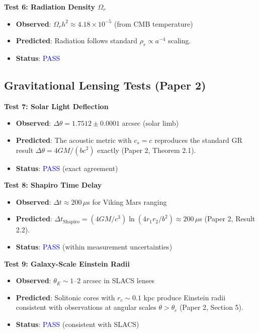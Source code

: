 \documentclass[11pt,a4paper]{article}
\theoremstyle{definition}
\theoremstyle{remark}
\begin{document}
\textbf{Test 6: Radiation Density $\Omega_r$}

\begin{itemize}[leftmargin=*, itemsep=0.1em]
\item \textbf{Observed}: $\Omega_r h^2 \approx 4.18 \times 10^{-5}$ (from CMB temperature)
\item \textbf{Predicted}: Radiation follows standard $\rho_r \propto a^{-4}$ scaling.
\item \textbf{Status}: \textcolor{blue}{PASS}
\end{itemize}

\subsection{Gravitational Lensing Tests (Paper 2)}
\label{sec:tests_lensing}

\textbf{Test 7: Solar Light Deflection}

\begin{itemize}[leftmargin=*, itemsep=0.1em]
\item \textbf{Observed}: $\Delta\theta = 1.7512 \pm 0.0001$ arcsec (solar limb)
\item \textbf{Predicted}: The acoustic metric with $c_s = c$ reproduces the standard GR result $\Delta\theta = 4GM/(bc^2)$ exactly (Paper 2, Theorem 2.1).
\item \textbf{Status}: \textcolor{blue}{PASS} (exact agreement)
\end{itemize}

\textbf{Test 8: Shapiro Time Delay}

\begin{itemize}[leftmargin=*, itemsep=0.1em]
\item \textbf{Observed}: $\Delta t \approx 200 \, \mu$s for Viking Mars ranging
\item \textbf{Predicted}: $\Delta t_{\mathrm{Shapiro}} = (4GM/c^3)\ln(4r_1 r_2/b^2) \approx 200 \, \mu$s (Paper 2, Result 2.2).
\item \textbf{Status}: \textcolor{blue}{PASS} (within measurement uncertainties)
\end{itemize}

\textbf{Test 9: Galaxy-Scale Einstein Radii}

\begin{itemize}[leftmargin=*, itemsep=0.1em]
\item \textbf{Observed}: $\theta_E \sim 1$--$2$ arcsec in SLACS lenses
\item \textbf{Predicted}: Solitonic cores with $r_c \sim 0.1$ kpc produce Einstein radii consistent with observations at angular scales $\theta > \theta_c$ (Paper 2, Section 5).
\item \textbf{Status}: \textcolor{blue}{PASS} (consistent with SLACS)
\end{itemize}
\end{document}
